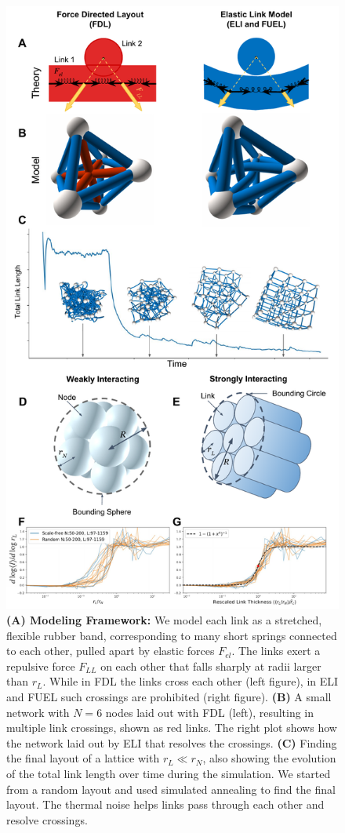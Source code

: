 \documentclass[12pt]{article}
\begin{document}
\begin{figure}
    \centering
    \includegraphics[width=.78\columnwidth, trim=0 12.5cm 0 0cm,clip]{fig-09-19/3d-crs-lat-trans-041018.pdf}
    \caption{
    \scriptsize
    {\bf(A) Modeling Framework:} We model each link as a stretched, flexible rubber band, 
    corresponding to many short springs connected to each other, pulled apart by
    elastic forces $F_{el}$. 
    The links exert a repulsive force $F_{LL}$  on each other that falls sharply at radii larger than $r_L$. 
    While in FDL the links cross each other (left figure), in ELI and FUEL such crossings are prohibited (right figure). 
    {\bf(B)} A small network with $N=6$ nodes laid out with FDL (left), resulting in multiple link crossings, shown as red links.   
    The right plot shows how the network laid out by ELI that resolves the crossings.
    {\bf (C)} Finding the final layout of a lattice with $r_L\ll r_N$, also showing the evolution of the total link length over time during the simulation. 
    We started from a random layout and used simulated annealing to find the final layout.
    The thermal noise helps links pass through each other and resolve crossings.}
    \label{fig:my_label}
\end{figure}



\end{document}
